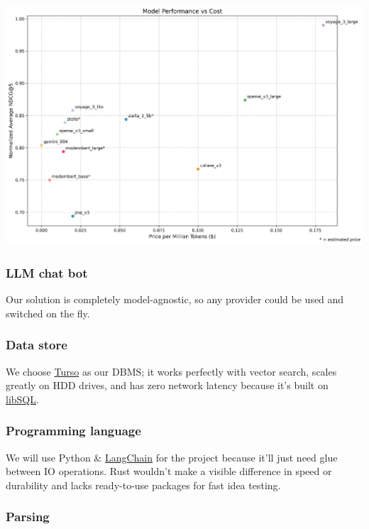 \documentclass[11pt]{article}
\begin{document}
\begin{center}
\includegraphics[width=.9\linewidth]{img/embedding-model-pricing.png}
\end{center}
\subsubsection{LLM chat bot}
\label{sec:org63002f1}

Our solution is completely model-agnostic, so any provider could be used and switched on the fly.
\subsubsection{Data store}
\label{sec:org5bcc9ce}

We choose \href{https://docs.turso.tech/introduction}{Turso} as our DBMS; it works perfectly with vector search, scales greatly on HDD drives, and has zero network latency because it's built on \href{https://github.com/tursodatabase/libsql/}{libSQL}.
\subsubsection{Programming language}
\label{sec:org3b0a361}

We will use Python \& \href{https://www.langchain.com/langchain}{LangChain} for the project because it'll just need glue between IO operations. Rust wouldn't make a visible difference in speed or durability and lacks ready-to-use packages for fast idea testing.
\subsubsection{Parsing}
\label{sec:org19fe494}
\end{document}
